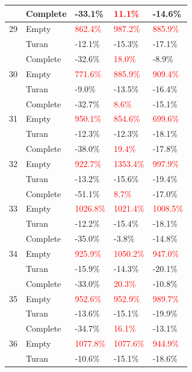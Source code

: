 \documentclass[12pt,a4paper]{article}
\begin{document}
\begin{longtable}{|l||l|l|l|l|}
  & Complete & -33.1\% & \textcolor{red}{11.1\%} & -14.6\% \\
  \hline
  29 & Empty & \textcolor{red}{862.4\%} & \textcolor{red}{987.2\%} & \textcolor{red}{885.9\%} \\
  & Turan & -12.1\% & -15.3\% & -17.1\% \\
  & Complete & -32.6\% & \textcolor{red}{18.0\%} & -8.9\% \\
  \hline
  30 & Empty & \textcolor{red}{771.6\%} & \textcolor{red}{885.9\%} & \textcolor{red}{909.4\%} \\
  & Turan & -9.0\% & -13.5\% & -16.4\% \\
  & Complete & -32.7\% & \textcolor{red}{8.6\%} & -15.1\% \\
  \hline
  31 & Empty & \textcolor{red}{950.1\%} & \textcolor{red}{854.6\%} & \textcolor{red}{699.6\%} \\
  & Turan & -12.3\% & -12.3\% & -18.1\% \\
  & Complete & -38.0\% & \textcolor{red}{19.4\%} & -17.8\% \\
  \hline
  32 & Empty & \textcolor{red}{922.7\%} & \textcolor{red}{1353.4\%} & \textcolor{red}{997.9\%} \\
  & Turan & -13.2\% & -15.6\% & -19.4\% \\
  & Complete & -51.1\% & \textcolor{red}{8.7\%} & -17.0\% \\
  \hline
  33 & Empty & \textcolor{red}{1026.8\%} & \textcolor{red}{1021.4\%} & \textcolor{red}{1008.5\%} \\
  & Turan & -12.2\% & -15.4\% & -18.1\% \\
  & Complete & -35.0\% & -3.8\% & -14.8\% \\
  \hline
  34 & Empty & \textcolor{red}{925.9\%} & \textcolor{red}{1050.2\%} & \textcolor{red}{947.0\%} \\
  & Turan & -15.9\% & -14.3\% & -20.1\% \\
  & Complete & -33.0\% & \textcolor{red}{20.3\%} & -10.8\% \\
  \hline
  35 & Empty & \textcolor{red}{952.6\%} & \textcolor{red}{952.9\%} & \textcolor{red}{989.7\%} \\
  & Turan & -13.6\% & -15.1\% & -19.9\% \\
  & Complete & -34.7\% & \textcolor{red}{16.1\%} & -13.1\% \\
  \hline
  36 & Empty & \textcolor{red}{1077.8\%} & \textcolor{red}{1077.6\%} & \textcolor{red}{944.9\%} \\
  & Turan & -10.6\% & -15.1\% & -18.6\% \\

\end{longtable}
\end{document}
